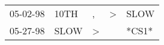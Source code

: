 \begin{supertabular}{lllll}
 05-02-98 &  10TH &             , &  \textgreater &   SLOW \\
 05-27-98 &  SLOW &  \textgreater &               &  *CS1* \\
\end{supertabular}
